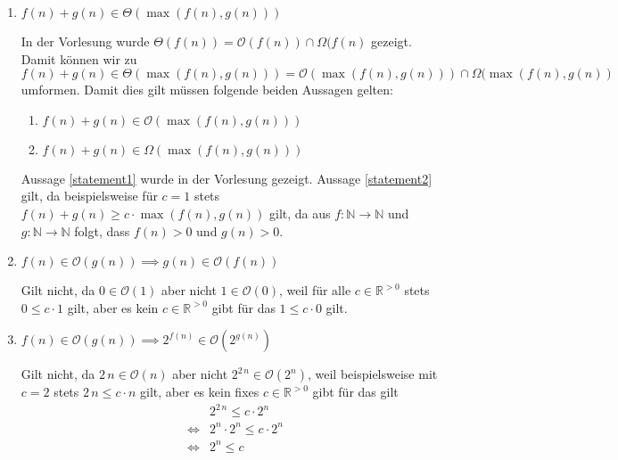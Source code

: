 \documentclass[german, solution]{acAssignment}
\begin{document}
\begin{enumerate}
    \item $f(n) + g(n) \in \Theta(\max(f(n), g(n)))$
    
        \begin{acSolution}
            In der Vorlesung wurde $\Theta(f(n)) = \mathcal{O}(f(n)) \cap \Omega(f(n)$ gezeigt.
            Damit können wir zu $f(n) + g(n) \in \Theta(\max(f(n), g(n))) = \mathcal{O}(\max(f(n), g(n))) \cap \Omega(\max(f(n), g(n))$ umformen.
            Damit dies gilt müssen folgende beiden Aussagen gelten:
            \begin{enumerate}[label=(\arabic*)]
            \item\label{statement1} $f(n) + g(n) \in \mathcal{O}(\max(f(n), g(n)))$
            \item\label{statement2} $f(n) + g(n) \in \Omega(\max(f(n), g(n)))$
            \end{enumerate}
            Aussage \ref{statement1} wurde in der Vorlesung gezeigt.
            Aussage \ref{statement2} gilt, da beispielsweise für $c=1$ stets $f(n) + g(n) \geq c \cdot \max(f(n), g(n))$ gilt, da aus $f:\mathbb{N} \to \mathbb{N}$ und $g:\mathbb{N} \to \mathbb{N}$ folgt, dass $f(n) > 0$ und $g(n) > 0$.
        \end{acSolution}
    
    \item $f(n) \in \mathcal{O}(g(n)) \implies g(n) \in \mathcal{O}(f(n))$
    
        \begin{acSolution}
            Gilt nicht, da $0 \in \mathcal{O}(1)$ aber nicht $1 \in \mathcal{O}(0)$, weil für alle $c \in \mathbb{R}^{>0}$ stets $0 \leq c \cdot 1$ gilt, aber es kein $c \in \mathbb{R}^{>0}$ gibt für das $1 \leq c \cdot 0$ gilt.
        \end{acSolution}
    
    \item $f(n) \in \mathcal{O}(g(n)) \implies 2^{f(n)} \in \mathcal{O}(2^{g(n)})$
    
        \begin{acSolution}
            Gilt nicht, da $2 \, n \in \mathcal{O}(n)$ aber nicht $2^{2 \, n} \in \mathcal{O}(2^n)$, weil beispielsweise mit $c = 2$ stets $2 \, n \leq c \cdot n$ gilt, aber es kein fixes $c \in \mathbb{R}^{>0}$ gibt für das gilt
            \begin{align*}
                & 2^{2 \, n} \leq c \cdot 2^n \\
                \iff & 2^n \cdot 2^n \leq c \cdot 2^n \\
                \iff & 2^n \leq c\\[-1cm]
            \end{align*}
        \end{acSolution}
    

\end{enumerate}
\end{document}
